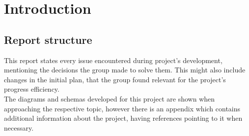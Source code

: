 %
%

\chapter{Introduction}

\section{Report structure}

This report states every issue encountered during project's development, mentioning the 
decisions the group made to solve them. This might also include changes in the
initial plan, that the group found relevant for the project's progress efficiency.\\

The diagrams and schemas developed for this project are shown when approaching the respective topic,
however there is an appendix which contains additional information about the project, having 
references pointing to it when necessary.